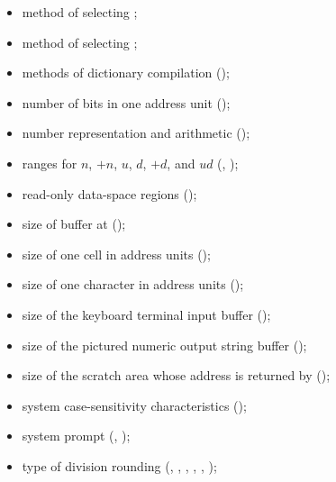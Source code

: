 \begin{itemize}
\item method of selecting ;

\item method of selecting ;

\item methods of dictionary compilation
	();

\item number of bits in one address unit
	();

\item number representation and arithmetic
	();

\item ranges for $n$, $+n$, $u$, $d$, $+d$, and $ud$
	(,
	 );

\item read-only data-space regions
	();

\item size of buffer at 
	();

\item size of one cell in address units
	();

\item size of one character in address units
	();

\item size of the keyboard terminal input buffer
	();

\item size of the pictured numeric output string buffer
	();

\item size of the scratch area whose address is returned by
	 ();

\item system case-sensitivity characteristics
	();

\item system prompt (,
	);

\item type of division rounding (,
	, , ,
	, );


\end{itemize}
